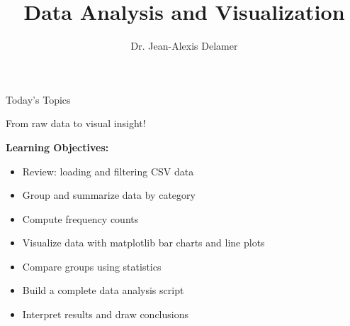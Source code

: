 \documentclass{csbeamer}
\title{Data Analysis and Visualization}
\author{Dr. Jean-Alexis Delamer}
\begin{document}
\begin{frame}
\titlepage
\end{frame}

\begin{frame}{Today's Topics}
    \begin{center}
        \Large From raw data to visual insight!
    \end{center}

    \vspace{1em}

    \textbf{Learning Objectives:}
    \begin{itemize}
        \item<1-> \textcolor{stfxblue}{Review:} loading and filtering CSV data
        \item<2-> \textcolor{marigold}{Group} and summarize data by category
        \item<3-> Compute \textcolor{stfxblue}{frequency counts}
        \item<4-> Visualize data with \textcolor{marigold}{matplotlib} bar charts and line plots
        \item<5-> \textcolor{stfxblue}{Compare groups} using statistics
        \item<6-> Build a complete \textcolor{marigold}{data analysis script}
        \item<7-> \textcolor{stfxblue}{Interpret results} and draw conclusions
    \end{itemize}

    \vspace{1em}

    \begin{center}
    \end{center}
\end{frame}
\end{document}
